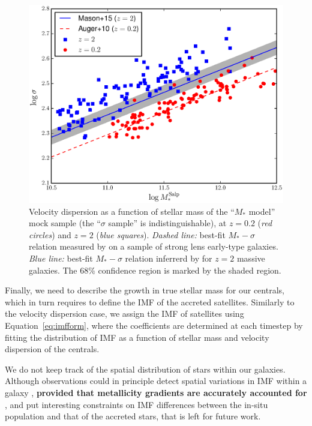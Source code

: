 \documentclass[usenatbib, letters]{mnras}
\def\Eref#1{Equation~\ref{#1}\xspace}
\begin{document}
\begin{figure}
 \includegraphics[width=\columnwidth]{mstar-vdisp_evolution.eps}
 \caption{ 
Velocity dispersion as a function of stellar mass of the ``$M_*$ model'' mock sample (the ``$\sigma$ sample'' is indistinguishable), at $z=0.2$ ({\em red circles}) and $z=2$ ({\em blue squares}).
{\em Dashed line:} best-fit $M_*-\sigma$ relation measured by \citet{Aug++10} on a sample of strong lens early-type galaxies.
{\em Blue line:} best-fit $M_*-\sigma$ relation inferrerd by \citet{Mas++15} for $z=2$ massive galaxies. The $68\%$ confidence region is marked by the shaded region.
}
 \label{fig:vdisp}
\end{figure}
%

Finally, we need to describe the growth in true stellar mass for our centrals, which in turn requires to define the IMF of the accreted satellites.
Similarly to the velocity dispersion case, we assign the IMF of satellites using \Eref{eq:imfform}, where the coefficients are determined at each timestep by fitting the distribution of IMF as a function of stellar mass and velocity dispersion of the centrals.

We do not keep track of the spatial distribution of stars within our galaxies. Although observations could in principle detect spatial variations in IMF within a galaxy \citep{Mar++15}, {\bf provided that metallicity gradients are accurately accounted for \citep{MLM16}}, and put interesting constraints on IMF differences between the in-situ population and that of the accreted stars, that is left for future work.
\end{document}

